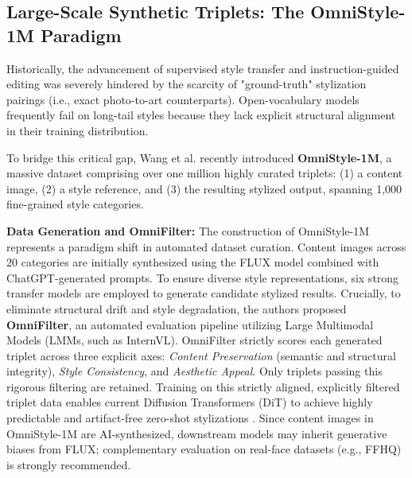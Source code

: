 \documentclass[journal]{IEEEtran}
\begin{document}
\subsection{Large-Scale Synthetic Triplets: The OmniStyle-1M Paradigm}
\label{sec:datasets:omnistyle}

Historically, the advancement of supervised style transfer and instruction-guided editing was severely hindered by the scarcity of "ground-truth" stylization pairings (i.e., exact photo-to-art counterparts). Open-vocabulary models frequently fail on long-tail styles because they lack explicit structural alignment in their training distribution.

To bridge this critical gap, Wang et al. \cite{wang2025omnistyle} recently introduced \textbf{OmniStyle-1M}, a massive dataset comprising over one million highly curated triplets: (1) a content image, (2) a style reference, and (3) the resulting stylized output, spanning 1,000 fine-grained style categories.

\textbf{Data Generation and OmniFilter:} The construction of OmniStyle-1M represents a paradigm shift in automated dataset curation. Content images across 20 categories are initially synthesized using the FLUX model combined with ChatGPT-generated prompts. To ensure diverse style representations, six strong transfer models are employed to generate candidate stylized results. Crucially, to eliminate structural drift and style degradation, the authors proposed \textbf{OmniFilter}, an automated evaluation pipeline utilizing Large Multimodal Models (LMMs, such as InternVL). OmniFilter strictly scores each generated triplet across three explicit axes: \textit{Content Preservation} (semantic and structural integrity), \textit{Style Consistency}, and \textit{Aesthetic Appeal}. Only triplets passing this rigorous filtering are retained. Training on this strictly aligned, explicitly filtered triplet data enables current Diffusion Transformers (DiT) to achieve highly predictable and artifact-free zero-shot stylizations \cite{wang2025omnistyle}. Since content images in OmniStyle-1M are AI-synthesized, downstream models may inherit generative biases from FLUX; complementary evaluation on real-face datasets (e.g., FFHQ) is strongly recommended.

\end{document}
